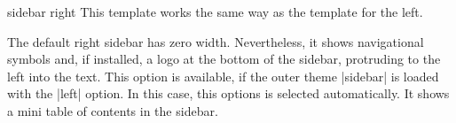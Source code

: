 \begin{element}{sidebar right}\yes\yes\yes
  This template works the same way as the template for the left.
  
  \begin{templateoptions}
    The default right sidebar has zero width. Nevertheless, it shows
    navigational symbols and, if installed, a logo at the bottom of
    the sidebar, protruding to the left into the text.
    This option is available, if the outer theme |sidebar| is loaded
    with the |left| option. In this case, this options is selected
    automatically. It shows a mini table of contents in the sidebar.
  \end{templateoptions}
\end{element}

